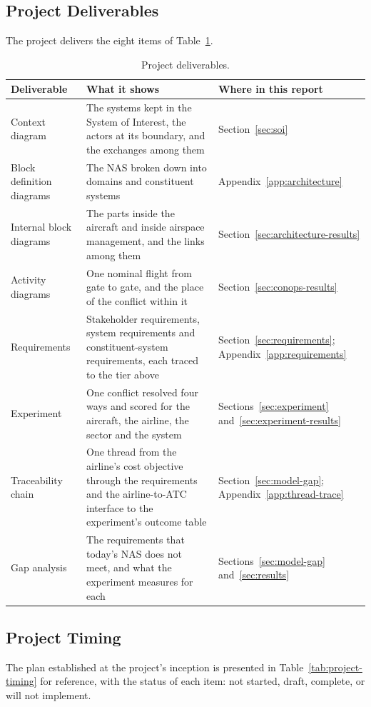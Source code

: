 \subsection{Project Deliverables}
\label{sec:deliverables}
The project delivers the eight items of Table~\ref{tab:deliverables}.
\begin{table}[htbp]
\centering
\small
\caption{Project deliverables.}
\label{tab:deliverables}
\begin{tabular}{@{}p{3.6cm}p{7.6cm}p{3.6cm}@{}}
\toprule
Deliverable & What it shows & Where in this report \\
\midrule
Context diagram & The systems kept in the System of Interest, the actors at its boundary, and the exchanges among them & Section~\ref{sec:soi} \\
Block definition diagrams & The NAS broken down into domains and constituent systems & Appendix~\ref{app:architecture} \\
Internal block diagrams & The parts inside the aircraft and inside airspace management, and the links among them & Section~\ref{sec:architecture-results} \\
Activity diagrams & One nominal flight from gate to gate, and the place of the conflict within it & Section~\ref{sec:conops-results} \\
Requirements & Stakeholder requirements, system requirements and constituent-system requirements, each traced to the tier above & Section~\ref{sec:requirements}; Appendix~\ref{app:requirements} \\
Experiment & One conflict resolved four ways and scored for the aircraft, the airline, the sector and the system & Sections~\ref{sec:experiment} and~\ref{sec:experiment-results} \\
Traceability chain & One thread from the airline's cost objective through the requirements and the airline-to-ATC interface to the experiment's outcome table & Section~\ref{sec:model-gap}; Appendix~\ref{app:thread-trace} \\
Gap analysis & The requirements that today's NAS does not meet, and what the experiment measures for each & Sections~\ref{sec:model-gap} and~\ref{sec:results} \\
\bottomrule
\end{tabular}
\end{table}

\subsection{Project Timing}
\label{sec:timing}
The plan established at the project's inception is presented in Table~\ref{tab:project-timing} for reference, with the status of each item: not started, draft, complete, or will not implement.

